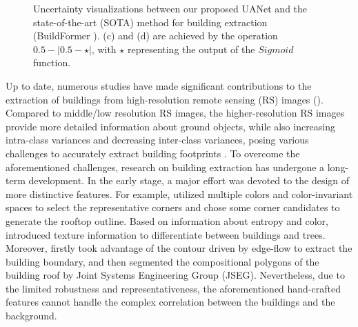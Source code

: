 \documentclass[lettersize,journal]{IEEEtran}
\begin{document}
\begin{figure}[t]
\vspace{-2.0em}
\centering
{}
\hfil
{}
\hfil
{}

\caption{Uncertainty visualizations between our proposed UANet and the state-of-the-art (SOTA) method for building extraction (BuildFormer \cite{BuildFormer}). (c) and (d) are achieved by the operation $0.5-|0.5-\star|$, with $\star$ representing the output of the $Sigmoid$ function.}
\vspace{-2.em}
\label{fig_1}
\end{figure}
\par
Up to date, numerous studies have made significant contributions to the extraction of buildings from high-resolution remote sensing (RS) images (\cite{DSNet,BuildFormer,MA_FCN}). Compared to middle/low resolution RS images, the higher-resolution RS images provide more detailed information about ground objects, while also increasing intra-class variances and decreasing inter-class variances, posing various challenges to accurately extract building footprints \cite{variance_inter_intra}.
To overcome the aforementioned challenges, research on building extraction has undergone a long-term development. In the early stage, a major effort was devoted to the design of more distinctive features. For example, \cite{color} utilized multiple colors and color-invariant spaces to select the representative corners and chose some corner candidates to generate the rooftop outline. Based on information about entropy and color, \cite{texture} introduced texture information to differentiate between buildings and trees. Moreover, \cite{contour} firstly took advantage of the contour driven by edge-flow to extract the building boundary, and then segmented the compositional polygons of the building roof by Joint Systems Engineering Group (JSEG). Nevertheless, due to the limited robustness and representativeness, the aforementioned hand-crafted features cannot handle the complex correlation between the buildings and the background.
\end{document}
